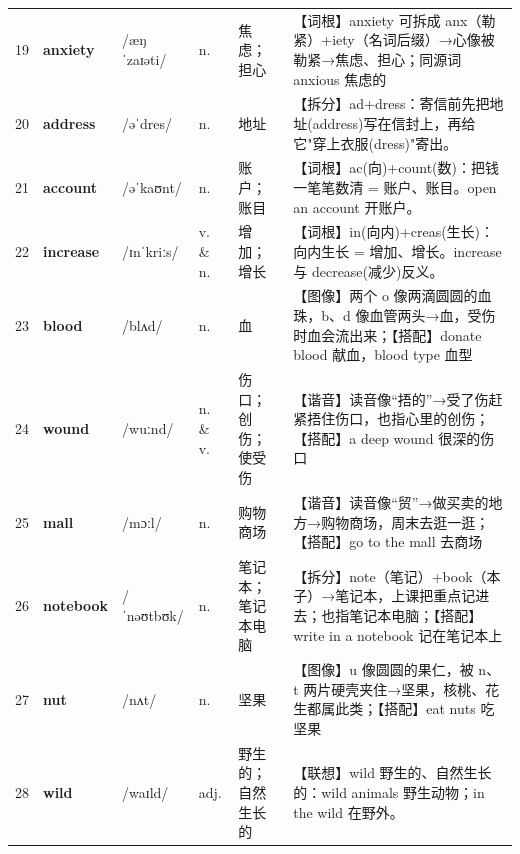 \documentclass[UTF8,a4paper,11pt,oneside]{ctexbook}
\newcommand{\cellword}[1]{{\bfseries\textcolor{wordcol}{#1}}}
\newcommand{\cellipa}[1]{{\footnotesize\textcolor{ipacol}{#1}}}
\newcommand{\cellpos}[1]{\textcolor{poscol}{#1}}
\newcommand{\cellno}[1]{\textcolor{volcolor!75!black}{#1}}
\begin{document}
{\begin{longtable}{@{}C{0.045\textwidth}L{0.155\textwidth}L{0.175\textwidth}C{0.070\textwidth}L{0.180\textwidth}L{0.282\textwidth}@{}}
 \cellno{19} & \cellword{anxiety} & \cellipa{/æŋˈzaɪəti/} & \cellpos{n.} & 焦虑；担心 & \textcolor{tagRoot}{【词根】}anxiety 可拆成 anx（勒紧）+iety（名词后缀）→\allowbreak{}心像被勒紧→\allowbreak{}焦虑、担心；同源词 anxious 焦虑的 \\
\cellno{20} & \cellword{address} & \cellipa{/əˈdres/} & \cellpos{n.} & 地址 & \textcolor{tagSplit}{【拆分】}ad+dress：寄信前先把地址(address)写在信封上，再给它"穿上衣服(dress)"寄出。 \\
 \cellno{21} & \cellword{account} & \cellipa{/əˈkaʊnt/} & \cellpos{n.} & 账户；账目 & \textcolor{tagRoot}{【词根】}ac(向)+count(数)：把钱一笔笔数清 = 账户、账目。open an account 开账户。 \\
\cellno{22} & \cellword{increase} & \cellipa{/ɪnˈkriːs/} & \cellpos{v.  \& n.} & 增加；增长 & \textcolor{tagRoot}{【词根】}in(向内)+creas(生长)：向内生长 = 增加、增长。increase 与 decrease(减少)反义。 \\
 \cellno{23} & \cellword{blood} & \cellipa{/blʌd/} & \cellpos{n.} & 血 & \textcolor{tagImage}{【图像】}两个 o 像两滴圆圆的血珠，b、d 像血管两头→\allowbreak{}血，受伤时血会流出来；\textcolor{tagColloc}{【搭配】}donate blood 献血，blood type 血型 \\
\cellno{24} & \cellword{wound} & \cellipa{/wuːnd/} & \cellpos{n.  \& v.} & 伤口；创伤；使受伤 & \textcolor{tagSound}{【谐音】}读音像“捂的”→\allowbreak{}受了伤赶紧捂住伤口，也指心里的创伤；\textcolor{tagColloc}{【搭配】}a deep wound 很深的伤口 \\
 \cellno{25} & \cellword{mall} & \cellipa{/mɔːl/} & \cellpos{n.} & 购物商场 & \textcolor{tagSound}{【谐音】}读音像“贸”→\allowbreak{}做买卖的地方→\allowbreak{}购物商场，周末去逛一逛；\textcolor{tagColloc}{【搭配】}go to the mall 去商场 \\
\cellno{26} & \cellword{notebook} & \cellipa{/ˈnəʊtbʊk/} & \cellpos{n.} & 笔记本；笔记本电脑 & \textcolor{tagSplit}{【拆分】}note（笔记）+book（本子）→\allowbreak{}笔记本，上课把重点记进去；也指笔记本电脑；\textcolor{tagColloc}{【搭配】}write in a notebook 记在笔记本上 \\
 \cellno{27} & \cellword{nut} & \cellipa{/nʌt/} & \cellpos{n.} & 坚果 & \textcolor{tagImage}{【图像】}u 像圆圆的果仁，被 n、t 两片硬壳夹住→\allowbreak{}坚果，核桃、花生都属此类；\textcolor{tagColloc}{【搭配】}eat nuts 吃坚果 \\
\cellno{28} & \cellword{wild} & \cellipa{/waɪld/} & \cellpos{adj.} & 野生的；自然生长的 & \textcolor{tagAssoc}{【联想】}wild 野生的、自然生长的：wild animals 野生动物；in the wild 在野外。 \\

\end{longtable}}
\end{document}
